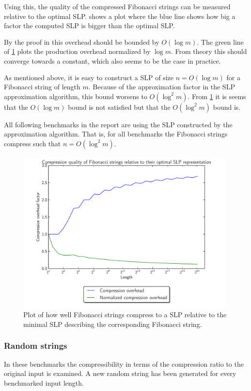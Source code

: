 \documentclass[twoside,11pt,openright]{report}
\begin{document}
Using this, the quality of the compressed Fibonacci strings can be measured relative to the optimal SLP.  shows a plot where the blue line shows how big a factor the computed SLP is bigger than the optimal SLP.

By the proof in \cite{Rytter2003211} this overhead should be bounded by $O(\log{m})$. The green line of \cref{fig:compression:quality:fibonacci} plots the production overhead normalized by $\log{m}$. From theory this should converge towards a constant, which also seems to be the case in practice.

As mentioned above, it is easy to construct a SLP of size $n = O(\log{m})$ for a Fibonacci string of length $m$. Because of the approximation factor in the SLP approximation algorithm, this bound worsens to $O(\log^2{m})$. From \cref{fig:compression:quality:fibonacci} it is seems that the $O(\log{m})$ bound is not satisfied but that the $O(\log^2{m})$ bound is.

All following benchmarks in the report are using the SLP constructed by the approximation algorithm. That is, for all benchmarks the Fibonacci strings compress such that $n = O(\log^2{m})$.
%
\begin{figure}[h!]
  \centering
  \includegraphics[width=11cm]{compression/fib}
  \caption{Plot of how well Fibonacci strings compress to a SLP relative to the minimal SLP describing the corresponding Fibonacci string.}
  \label{fig:compression:quality:fibonacci}
\end{figure}

\subsubsection{Random strings}
In these benchmarks the compressibility in terms of the compression ratio to the original input is examined. A new random string has been generated for every benchmarked input length.
\end{document}
